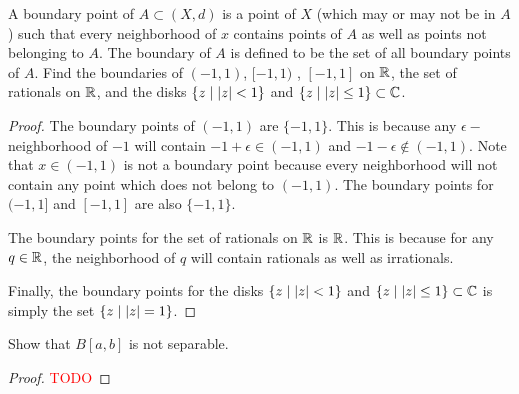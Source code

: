 \begin{question}
    A boundary point of $A \subset (X,d)$ is a point of $X$ (which may or may not be in $A$) such that every neighborhood of $x$ contains points of $A$ as well as points not belonging to $A$. The boundary of $A$ is defined to be the set of all boundary points of $A$. Find the boundaries of $(-1,1)$, $[-1,1)$ , $[-1,1]$ on $\mathbb{R}$, the set of rationals on $\mathbb{R}$, and the disks $\{z \mid \left\lvert z \right\rvert < 1\}$ and $\{z \mid \left\lvert z \right\rvert \leq 1\} \subset \mathbb{C}$.
\label{section1.3-11}
\end{question}
\begin{proof}
    The boundary points of $(-1,1)$ are $\{-1,1\}.$ This is because any $\epsilon-$neighborhood of $-1$ will contain $-1+\epsilon \in (-1,1)$ and $-1-\epsilon \notin (-1,1)$. Note that $x \in (-1,1)$ is not a boundary point because every neighborhood will not contain any point which does not belong to $(-1,1)$. The boundary points for $(-1,1]$ and $[-1,1]$ are also $\{-1,1\}$.

    The boundary points for the set of rationals on $\mathbb{R}$ is $\mathbb{R}$. This is because for any $q \in \mathbb{R}$, the neighborhood of $q$ will contain rationals as well as irrationals. 

    Finally, the boundary points for the disks $\{z \mid \left\lvert z \right\rvert < 1\}$ and $\{z \mid \left\lvert z \right\rvert \leq 1\} \subset \mathbb{C}$ is simply the set $\{z \mid \left\lvert z \right\rvert = 1\}$.
\end{proof}

\begin{question}
    Show that $B[a,b]$ is not separable.
    \label{section1.3-12}
\end{question}
\begin{proof}
    \textcolor{red}{TODO}
\end{proof}

